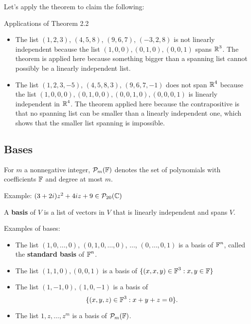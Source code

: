 Let's apply the theorem to claim the following:

\begin{example} Applications of Theorem 2.2
    \begin{itemize}
        \item The list $(1, 2, 3)$, $(4, 5, 8)$, $(9, 6, 7)$, $(-3, 2, 8)$ is not linearly 
        independent because the list 
        $(1, 0, 0), (0, 1, 0), (0, 0, 1)$ spans $\operatorname{\mathbb{R}}^3$. 
        The theorem is applied here because something bigger
        than a spanning list cannot possibly be a linearly independent list.
        \item The list
        $(1, 2, 3, -5)$, $(4, 5, 8, 3)$, $(9, 6, 7, -1)$ 
        does not span $\operatorname{\mathbb{R}}^4$ because
        the list $(1, 0, 0, 0), (0, 1, 0, 0), (0, 0, 1, 0), (0, 0, 0, 1)$ is linearly independent
        in $\operatorname{\mathbb{R}}^4$. The theorem applied here because the contrapositive is that no spanning list 
        can be smaller than a linearly independent one, which shows that the smaller list spanning
        is impossible.
    \end{itemize}
\end{example}

\subsection{Bases}

\begin{definition} [$\Polys{\F}{m}$]
    For $m$ a nonnegative integer, $\Polys{\F}{m}$ denotes
    the set of polynomials with coefficients $\operatorname{\mathbb{F}}$ and degree
    at most $m$.
\end{definition}

Example:
$(3 + 2i)z^2 + 4iz + 9 \in \mathcal{P}_{20}(\operatorname{\mathbb{C}})$

\begin{definition} [basis]
    A \textbf{basis} of $V$ is a list of vectors in $V$
    that is linearly independent and spans $V$.
\end{definition}

\begin{example} Examples of bases:
   \begin{itemize}
       \item The list $(1, 0, \dots, 0)$, $(0,1,0,\dots,0)$, $\dots$,
       $(0, \dots, 0, 1)$ is a basis of $\operatorname{\mathbb{F}}^n$, called the \textbf{standard basis}
       of $\operatorname{\mathbb{F}}^n$.
       \item The list $(1,1,0),(0,0,1)$ is a basis of $\{(x,x,y) \in \operatorname{\mathbb{F}}^3 : x, y \in \operatorname{\mathbb{F}} \}$
       \item The list $(1, -1, 0), (1, 0, -1)$ is a basis of 
       \[ \{(x, y, z) \in \operatorname{\mathbb{F}}^3 : x + y + z = 0\}. \]
       \item The list $1, z, \dots, z^m$ is a basis of $\Polys{\F}{m}$.
   \end{itemize}
\end{example}

